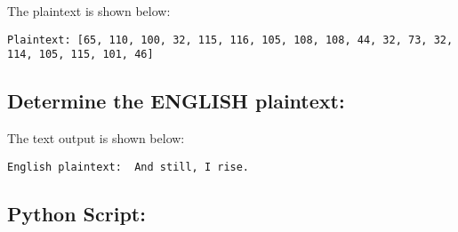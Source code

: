 \documentclass{article}
\begin{document}
The plaintext is shown below:
\begin{verbatim}
Plaintext: [65, 110, 100, 32, 115, 116, 105, 108, 108, 44, 32, 73, 32, 114, 105, 115, 101, 46]
\end{verbatim}

\subsection*{Determine the ENGLISH plaintext:}
The text output is shown below:
\begin{verbatim}
English plaintext:  And still, I rise.
\end{verbatim}

\newpage
\subsection*{Python Script:}

\end{document}
